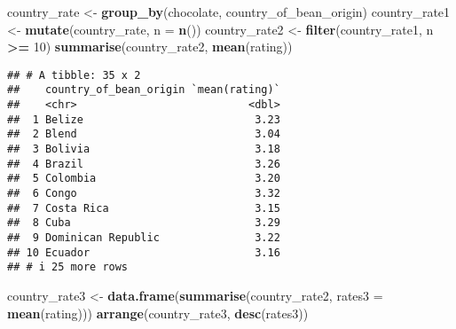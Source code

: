 \documentclass[
]{article}
\newenvironment{Shaded}{\begin{snugshade}}{\end{snugshade}}
\newcommand{\AttributeTok}[1]{\textcolor[rgb]{0.13,0.29,0.53}{#1}}
\newcommand{\DecValTok}[1]{\textcolor[rgb]{0.00,0.00,0.81}{#1}}
\newcommand{\FunctionTok}[1]{\textcolor[rgb]{0.13,0.29,0.53}{\textbf{#1}}}
\newcommand{\NormalTok}[1]{#1}
\newcommand{\OtherTok}[1]{\textcolor[rgb]{0.56,0.35,0.01}{#1}}
\newcommand{\SpecialCharTok}[1]{\textcolor[rgb]{0.81,0.36,0.00}{\textbf{#1}}}
\begin{document}
\begin{Shaded}
\begin{Highlighting}[]
\NormalTok{country\_rate }\OtherTok{\textless{}{-}} \FunctionTok{group\_by}\NormalTok{(chocolate, country\_of\_bean\_origin)}
\NormalTok{country\_rate1 }\OtherTok{\textless{}{-}} \FunctionTok{mutate}\NormalTok{(country\_rate, }\AttributeTok{n =} \FunctionTok{n}\NormalTok{())}
\NormalTok{country\_rate2 }\OtherTok{\textless{}{-}} \FunctionTok{filter}\NormalTok{(country\_rate1, n }\SpecialCharTok{\textgreater{}=} \DecValTok{10}\NormalTok{)}
\FunctionTok{summarise}\NormalTok{(country\_rate2, }\FunctionTok{mean}\NormalTok{(rating))}
\end{Highlighting}
\end{Shaded}

\begin{verbatim}
## # A tibble: 35 x 2
##    country_of_bean_origin `mean(rating)`
##    <chr>                           <dbl>
##  1 Belize                           3.23
##  2 Blend                            3.04
##  3 Bolivia                          3.18
##  4 Brazil                           3.26
##  5 Colombia                         3.20
##  6 Congo                            3.32
##  7 Costa Rica                       3.15
##  8 Cuba                             3.29
##  9 Dominican Republic               3.22
## 10 Ecuador                          3.16
## # i 25 more rows
\end{verbatim}

\begin{Shaded}
\begin{Highlighting}[]
\NormalTok{country\_rate3 }\OtherTok{\textless{}{-}} \FunctionTok{data.frame}\NormalTok{(}\FunctionTok{summarise}\NormalTok{(country\_rate2, }\AttributeTok{rates3 =} \FunctionTok{mean}\NormalTok{(rating)))}
\FunctionTok{arrange}\NormalTok{(country\_rate3, }\FunctionTok{desc}\NormalTok{(rates3))}
\end{Highlighting}
\end{Shaded}
\end{document}
